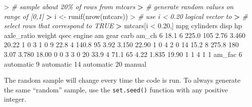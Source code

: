 \documentclass[
]{book}
\newenvironment{Shaded}{\begin{snugshade}}{\end{snugshade}}
\newcommand{\CommentTok}[1]{\textcolor[rgb]{0.56,0.35,0.01}{\textit{#1}}}
\newcommand{\DecValTok}[1]{\textcolor[rgb]{0.00,0.00,0.81}{#1}}
\newcommand{\ErrorTok}[1]{\textcolor[rgb]{0.64,0.00,0.00}{\textbf{#1}}}
\newcommand{\FloatTok}[1]{\textcolor[rgb]{0.00,0.00,0.81}{#1}}
\newcommand{\FunctionTok}[1]{\textcolor[rgb]{0.00,0.00,0.00}{#1}}
\newcommand{\NormalTok}[1]{#1}
\newcommand{\OtherTok}[1]{\textcolor[rgb]{0.56,0.35,0.01}{#1}}
\newcommand{\SpecialCharTok}[1]{\textcolor[rgb]{0.00,0.00,0.00}{#1}}
\begin{document}
\begin{Shaded}
\begin{Highlighting}[]
\SpecialCharTok{\textgreater{}} \CommentTok{\# sample about 20\% of rows from mtcars}
\ErrorTok{\textgreater{}} \CommentTok{\# generate random values on range of [0,1]}
\ErrorTok{\textgreater{}}\NormalTok{ i }\OtherTok{\textless{}{-}} \FunctionTok{runif}\NormalTok{(}\FunctionTok{nrow}\NormalTok{(mtcars))}
\SpecialCharTok{\textgreater{}} \CommentTok{\# use i \textless{} 0.20 logical vector to }
\ErrorTok{\textgreater{}} \CommentTok{\# select rows that correspond to TRUE}
\ErrorTok{\textgreater{}}\NormalTok{ mtcars[i }\SpecialCharTok{\textless{}} \FloatTok{0.20}\NormalTok{,]}
\NormalTok{    mpg cylinders  disp  hp axle\_ratio weight  qsec engine am gear carb am\_ch}
\DecValTok{6}  \FloatTok{18.1}         \DecValTok{6} \FloatTok{225.0} \DecValTok{105}       \FloatTok{2.76}  \FloatTok{3.460} \FloatTok{20.22}      \DecValTok{1}  \DecValTok{0}    \DecValTok{3}    \DecValTok{1}     \DecValTok{0}
\DecValTok{9}  \FloatTok{22.8}         \DecValTok{4} \FloatTok{140.8}  \DecValTok{95}       \FloatTok{3.92}  \FloatTok{3.150} \FloatTok{22.90}      \DecValTok{1}  \DecValTok{0}    \DecValTok{4}    \DecValTok{2}     \DecValTok{0}
\DecValTok{14} \FloatTok{15.2}         \DecValTok{8} \FloatTok{275.8} \DecValTok{180}       \FloatTok{3.07}  \FloatTok{3.780} \FloatTok{18.00}      \DecValTok{0}  \DecValTok{0}    \DecValTok{3}    \DecValTok{3}     \DecValTok{0}
\DecValTok{20} \FloatTok{33.9}         \DecValTok{4}  \FloatTok{71.1}  \DecValTok{65}       \FloatTok{4.22}  \FloatTok{1.835} \FloatTok{19.90}      \DecValTok{1}  \DecValTok{1}    \DecValTok{4}    \DecValTok{1}     \DecValTok{1}
\NormalTok{      am\_fac}
\DecValTok{6}\NormalTok{  automatic}
\DecValTok{9}\NormalTok{  automatic}
\DecValTok{14}\NormalTok{ automatic}
\DecValTok{20}\NormalTok{    manual}
\end{Highlighting}
\end{Shaded}

The random sample will change every time the code is run. To always generate the same ``random'' sample, use the \texttt{set.seed()} function with any positive integer.
\end{document}
